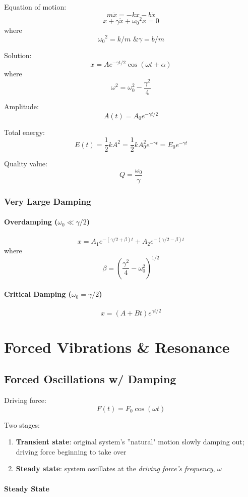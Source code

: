 \documentclass[11pt,letterpaper,titlepage,oneside]{book}
\begin{document}
Equation of motion:
\[ m\ddot{x} = -kx - b\dot{x} \]
\[ \ddot{x} + \gamma \dot{x} + {\omega_0}^2 x = 0 \]
where
\[ {\omega_0}^2 = k/m \text{ \& } \gamma = b/m \]

Solution:
\[ x = A e^{-\gamma t/2} \cos(\omega t + \alpha) \]
where
\[ \omega ^2 = \omega_0^2 - \frac{\gamma^2}{4} \]

Amplitude:
\[ A(t) = A_0 e^{-\gamma t/2} \]

Total energy:
\[ E(t) = \frac{1}{2}kA^2 = \frac{1}{2}kA_0^2 e^{-\gamma t} = E_0 e^{-\gamma t} \]

Quality value:
\[ Q = \frac{\omega_0}{\gamma} \]

\subsection{Very Large Damping}
\subsubsection{Overdamping ($ \omega_0 \ll \gamma/2 $)}
\[ x = A_1 e^{-(\gamma/2 + \beta)t} + A_2 e^{-(\gamma/2-\beta)t} \]
where \[ \beta = \left(\frac{\gamma^2}{4}-\omega_0^2 \right)^{1/2} \]

\subsubsection{Critical Damping ($ \omega_0 = \gamma/2 $)}
\[ x = (A + Bt) e^{\gamma t/2}\]

\chapter{Forced Vibrations \& Resonance}
\section{Forced Oscillations w/ Damping}
Driving force:
\[ F(t) = F_0 \cos(\omega t) \]

Two stages:
\begin{enumerate}
\item \textbf{Transient state}: original system's ''natural" motion slowly damping out; driving force beginning to take over
\item \textbf{Steady state}: system oscillates at the \emph{driving force's frequency}, $\omega$
\end{enumerate}

\subsubsection{Steady State}
\end{document}

